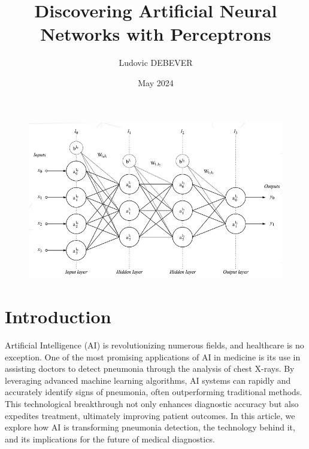 \documentclass{article}
\title{Discovering Artificial Neural Networks with Perceptrons}
\author{Ludovic DEBEVER}
\date{May 2024}
\begin{document}
\maketitle

\begin{figure}[!h]
    \centering
    \includegraphics[width=1\linewidth]{assets/cover.png}
    \label{fig:cover}
\end{figure}

\newpage

\section{Introduction}

Artificial Intelligence (AI) is revolutionizing numerous fields, and healthcare is no exception. One of the most promising applications of AI in medicine is its use in assisting doctors to detect pneumonia through the analysis of chest X-rays. By leveraging advanced machine learning algorithms, AI systems can rapidly and accurately identify signs of pneumonia, often outperforming traditional methods. This technological breakthrough not only enhances diagnostic accuracy but also expedites treatment, ultimately improving patient outcomes. In this article, we explore how AI is transforming pneumonia detection, the technology behind it, and its implications for the future of medical diagnostics.
\end{document}
